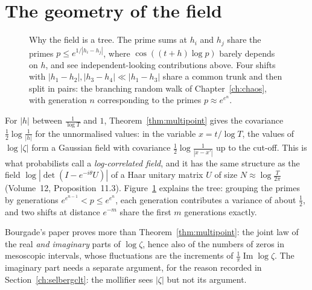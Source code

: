 \section{The geometry of the field}

\begin{figure}[ht]\centering
{}
\caption{Why the field is a tree. The prime sums at $h_i$ and $h_j$ share the primes $p\le e^{1/|h_i-h_j|}$, where $\cos((t+h)\log p)$ barely depends on $h$, and see independent-looking contributions above. Four shifts with $|h_1-h_2|,|h_3-h_4|\ll|h_1-h_3|$ share a common trunk and then split in pairs: the branching random walk of Chapter~\ref{ch:chaos}, with generation $n$ corresponding to the primes $p\approx e^{e^n}$.}
\label{fig:fieldtree}
\end{figure}

For $|h|$ between $\frac1{\log T}$ and $1$, Theorem~\ref{thm:multipoint} gives the covariance $\frac12\log\frac1{|h|}$ for the unnormalised values: in the variable $x=t/\log T$, the values of $\log|\zeta|$ form a Gaussian field with covariance $\frac12\log\frac1{|x-x'|}$ up to the cut-off. This is what probabilists call a \emph{log-correlated field}, and it has the same structure as the field $\log|\det(I-e^{-i\theta}U)|$ of a Haar unitary matrix $U$ of size $N\approx\log\frac T{2\pi}$ (Volume~12, Proposition~11.3). Figure~\ref{fig:fieldtree} explains the tree: grouping the primes by generations $e^{e^{n-1}}<p\le e^{e^n}$, each generation contributes a variance of about $\frac12$, and two shifts at distance $e^{-m}$ share the first $m$ generations exactly.

\begin{remark}\label{rem:bourgade}
Bourgade's paper proves more than Theorem~\ref{thm:multipoint}: the joint law of the real \emph{and imaginary} parts of $\log\zeta$, hence also of the numbers of zeros in mesoscopic intervals, whose fluctuations are the increments of $\frac1\pi\operatorname{Im}\log\zeta$. The imaginary part needs a separate argument, for the reason recorded in Section~\ref{ch:selbergclt}: the mollifier sees $|\zeta|$ but not its argument.
\end{remark}

